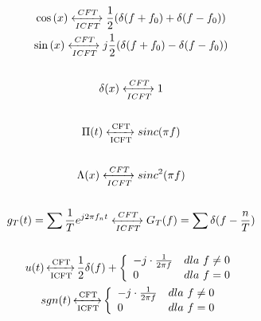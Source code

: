 \begin{multicols}{2}
        \indent
        \begin{gather*}
            \cos{(x)} \xleftrightarrow[ICFT]{CFT} \frac{1}{2}(\delta(f+f_0) + \delta(f-f_0))\\
            \sin{(x)} \xleftrightarrow[ICFT]{CFT} j\frac{1}{2}(\delta(f+f_0) - \delta(f-f_0))\\\\
            \delta(x) \xleftrightarrow[ICFT]{CFT} 1\\\\
            \Pi(t) \xleftrightarrow[\text{ICFT}]{\text{CFT}} sinc(\pi f)\\\\
            \Lambda(x) \xleftrightarrow[ICFT]{CFT} sinc^2(\pi f)\\\\
            g_T(t) = \sum \frac{1}{T} e^{j2\pi f_n t} \xleftrightarrow[ICFT]{CFT} G_T(f) = \sum \delta(f-\frac{n}{T})\\\\
            u(t) \operatorname{\xleftrightarrow[\text{ICFT}]{\text{CFT}}} \frac{1}{2}\delta(f) + \left\{\begin{array}{l l}
                -j\cdot\frac{1}{2\pi f} & dla\ f\ne 0\\
                0 & dla\ f=0
            \end{array}\right.\\
            sgn(t) \operatorname{\xleftrightarrow[\text{ICFT}]{\text{CFT}}} \left\{\begin{array}{l l}
                -j\cdot\frac{1}{2\pi f} & dla\ f\ne0\\
                0 & dla\ f=0
            \end{array}\right.
        \end{gather*}
    \end{multicols}


